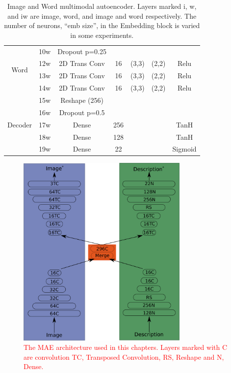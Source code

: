 \begin{table}
\begin{tabular}{|c|c|c|c|c|c|c|}
			\multirow{4}{*}{Word} & 10w 	&	Dropout p=0.25 &	 & 	     &       & \\ \cline{2-7}
			& 12w	&	2D Trans Conv & 16 & (3,3) & (2,2)  & Relu \\ \cline{2-7}
			& 13w	&	2D Trans Conv & 16 & (3,3) & (2,2)  & Relu \\ \cline{2-7}
			& 14w	&	2D Trans Conv & 16 & (3,3) & (2,2)  & Relu \\ \cline{2-7}
\multirow{5}{*}{Decoder}& 15w	& Reshape (256) & & & & \\ \cline{2-7}
			& 16w	& Dropout p=0.5 &	 & 	     &       & \\ \cline{2-7}
			& 17w	& Dense & 256 & & &TanH \\ \cline{2-7}
			& 18w	& Dense & 128 & & &TanH \\ \cline{2-7}
			& 19w	& Dense & 22 & & & Sigmoid \\ \hline
			
			
		\end{tabular}
		\caption{Image and Word multimodal autoencoder. Layers marked i, w, and iw are image, word, and image and word respectively. The number of neurons, ``emb size'', in the Embedding block is varied in some experiments.}
		\label{tab:Arts_MAE_description}

	\end{table}
	
\begin{figure}
\centering
\includegraphics[width=0.75\textwidth]{Figs/shapes/maeArch.png}
\caption{\textcolor{red}{The \ac{MAE} architecture used in this chapters. Layers marked with C are convolution TC, Transposed Convolution, RS, Reshape and N, Dense.}}
\label{fig:netArts}
\end{figure}

